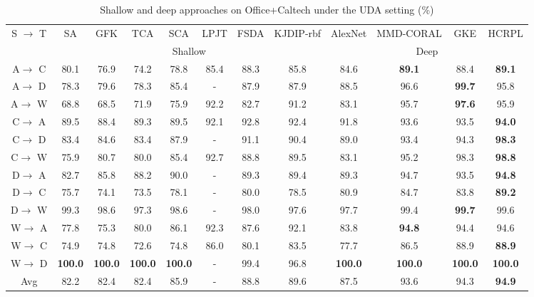 \documentclass[a4paper,fleqn]{cas-dc}
\begin{document}
	
	
	\begin{center}
		\begin{table}
			\scriptsize
			\centering
			\caption{Shallow and deep approaches on Office+Caltech under the UDA setting (\%)}
			\begin{tabular*}{\hsize}{@{}@{\extracolsep{\fill}}cccccccc|cccc@{}}
				\toprule
				\multirow{2}{*}{S $\rightarrow$ T} & SA \cite{6751479} & GFK \cite{gong2012geodesic} & TCA \cite{pan2010domain} & SCA \cite{Ghifary2017ScatterCA} & LPJT \cite{Jingjing2019LocalityPJ} & FSDA \cite{Sun2019InformativeFS} & KJDIP-rbf \cite{Chen2020DomainAB} & AlexNet \cite{krizhevsky2012imagenet} & MMD-CORAL \cite{Rahman2020OnMD} & GKE \cite{Wu2020GeometricKE} & HCRPL \\
				~ & \multicolumn{7}{c}{Shallow} & \multicolumn{4}{c}{Deep} \\
				\midrule
				A$\rightarrow$ C & 80.1 & 76.9 & 74.2 & 78.8 & 85.4 & 88.3 & 85.8 & 84.6 & \textbf{89.1} & 88.4 & \textbf{89.1}\\
				A$\rightarrow$ D & 78.3 & 79.6 & 78.3 & 85.4 & -    & 87.9 & 87.9 & 88.5 & 96.6 & \textbf{99.7} & 95.8\\
				A$\rightarrow$ W & 68.8 & 68.5 & 71.9 & 75.9 & 92.2 & 82.7 & 91.2 & 83.1 & 95.7 & \textbf{97.6} & 95.9\\
				C$\rightarrow$ A & 89.5 & 88.4 & 89.3 & 89.5 & 92.1 & 92.8 & 92.4 & 91.8 & 93.6 & 93.5 & \textbf{94.0}\\
				C$\rightarrow$ D & 83.4 & 84.6 & 83.4 & 87.9 & -    & 91.1 & 90.4 & 89.0 & 93.4 & 94.3 & \textbf{98.3}\\
				C$\rightarrow$ W & 75.9 & 80.7 & 80.0 & 85.4 & 92.7 & 88.8 & 89.5 & 83.1 & 95.2 & 98.3 & \textbf{98.8}\\
				D$\rightarrow$ A & 82.7 & 85.8 & 88.2 & 90.0 & -    & 89.3 & 89.4 & 89.3 & 94.7 & 93.5 & \textbf{94.8}\\
				D$\rightarrow$ C & 75.7 & 74.1 & 73.5 & 78.1 & -    & 80.0 & 78.5 & 80.9 & 84.7 & 83.8 & \textbf{89.2}\\
				D$\rightarrow$ W & 99.3 & 98.6 & 97.3 & 98.6 & -    & 98.0 & 97.6 & 97.7 & 99.4 & \textbf{99.7} & 99.6\\
				W$\rightarrow$ A & 77.8 & 75.3 & 80.0 & 86.1 & 92.3 & 87.6 & 92.1 & 83.8 & \textbf{94.8} & 94.4 & 94.6\\
				W$\rightarrow$ C & 74.9 & 74.8 & 72.6 & 74.8 & 86.0 & 80.1 & 83.5 & 77.7 & 86.5 & 88.9 & \textbf{88.9}\\
				W$\rightarrow$ D & \textbf{100.0} & \textbf{100.0} & \textbf{100.0} & \textbf{100.0} & -   & 99.4 & 96.8 & \textbf{100.0}& \textbf{100.0}& \textbf{100.0}& \textbf{100.0}\\
				Avg              & 82.2 & 82.4 & 82.4 & 85.9 & -    & 88.8 & 89.6 & 87.5 & 93.6 & 94.3 & \textbf{94.9}\\
				\bottomrule
			\end{tabular*}
			\label{tab4}
		\end{table}
	\end{center}
	
\end{document}
